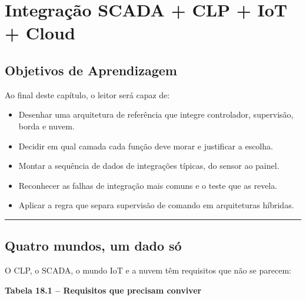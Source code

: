 \chapter{Integração SCADA + CLP + IoT + Cloud}\label{integrauxe7uxe3o-scada-clp-iot-cloud}

\section*{Objetivos de Aprendizagem}

Ao final deste capítulo, o leitor será capaz de:

\begin{itemize}
\tightlist
\item
  Desenhar uma arquitetura de referência que integre controlador, supervisão, borda e nuvem.
\item
  Decidir em qual camada cada função deve morar e justificar a escolha.
\item
  Montar a sequência de dados de integrações típicas, do sensor ao painel.
\item
  Reconhecer as falhas de integração mais comuns e o teste que as revela.
\item
  Aplicar a regra que separa supervisão de comando em arquiteturas híbridas.
\end{itemize}

\begin{center}\rule{0.5\linewidth}{0.5pt}\end{center}

\section{Quatro mundos, um dado só}\label{quatro-mundos-um-dado-suxf3}

O CLP, o SCADA, o mundo IoT e a nuvem têm requisitos que não se parecem:

\textbf{Tabela 18.1 -- Requisitos que precisam conviver}

